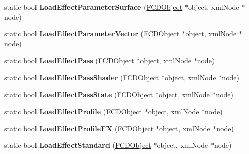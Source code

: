 \begin{DoxyCompactItemize}
\item 
\hypertarget{classFArchiveXML_ac507675658747c50aa09c93df518b500}{
static bool {\bfseries LoadEffectParameterSurface} (\hyperlink{classFCDObject}{FCDObject} $\ast$object, xmlNode $\ast$node)}
\label{classFArchiveXML_ac507675658747c50aa09c93df518b500}

\item 
\hypertarget{classFArchiveXML_a6696c767cda5cf04eee1535b776af176}{
static bool {\bfseries LoadEffectParameterVector} (\hyperlink{classFCDObject}{FCDObject} $\ast$object, xmlNode $\ast$node)}
\label{classFArchiveXML_a6696c767cda5cf04eee1535b776af176}

\item 
\hypertarget{classFArchiveXML_a2251423924d3c0353a07abc15b494297}{
static bool {\bfseries LoadEffectPass} (\hyperlink{classFCDObject}{FCDObject} $\ast$object, xmlNode $\ast$node)}
\label{classFArchiveXML_a2251423924d3c0353a07abc15b494297}

\item 
\hypertarget{classFArchiveXML_a019160d91b921e4a8b2a16310044df3f}{
static bool {\bfseries LoadEffectPassShader} (\hyperlink{classFCDObject}{FCDObject} $\ast$object, xmlNode $\ast$node)}
\label{classFArchiveXML_a019160d91b921e4a8b2a16310044df3f}

\item 
\hypertarget{classFArchiveXML_a853a7dc1f9dcea98145943d0b569f3eb}{
static bool {\bfseries LoadEffectPassState} (\hyperlink{classFCDObject}{FCDObject} $\ast$object, xmlNode $\ast$node)}
\label{classFArchiveXML_a853a7dc1f9dcea98145943d0b569f3eb}

\item 
\hypertarget{classFArchiveXML_a82e1f4d0f14af35527ec2a7fd51ef02f}{
static bool {\bfseries LoadEffectProfile} (\hyperlink{classFCDObject}{FCDObject} $\ast$object, xmlNode $\ast$node)}
\label{classFArchiveXML_a82e1f4d0f14af35527ec2a7fd51ef02f}

\item 
\hypertarget{classFArchiveXML_a321afcd5fb3bf1bd8f0a6068ea95f230}{
static bool {\bfseries LoadEffectProfileFX} (\hyperlink{classFCDObject}{FCDObject} $\ast$object, xmlNode $\ast$node)}
\label{classFArchiveXML_a321afcd5fb3bf1bd8f0a6068ea95f230}

\item 
\hypertarget{classFArchiveXML_a5bf4e7feb6cf2e1d8cecc47a2d5c5d5a}{
static bool {\bfseries LoadEffectStandard} (\hyperlink{classFCDObject}{FCDObject} $\ast$object, xmlNode $\ast$node)}
\label{classFArchiveXML_a5bf4e7feb6cf2e1d8cecc47a2d5c5d5a}


\end{DoxyCompactItemize}
